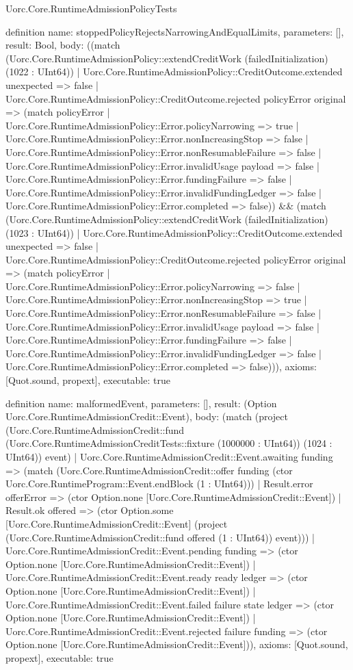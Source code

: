 \begin{lexlean}{Uorc.Core.RuntimeAdmissionPolicyTests}
\begin{semanticmodule}
definition{
  name: stoppedPolicyRejectsNarrowingAndEqualLimits,
  parameters: [],
  result: Bool,
  body: ((match (Uorc.Core.RuntimeAdmissionPolicy::extendCreditWork (failedInitialization) (1022 : UInt64))
    | Uorc.Core.RuntimeAdmissionPolicy::CreditOutcome.extended unexpected => false
    | Uorc.Core.RuntimeAdmissionPolicy::CreditOutcome.rejected policyError original => (match policyError
      | Uorc.Core.RuntimeAdmissionPolicy::Error.policyNarrowing => true
      | Uorc.Core.RuntimeAdmissionPolicy::Error.nonIncreasingStop => false
      | Uorc.Core.RuntimeAdmissionPolicy::Error.nonResumableFailure => false
      | Uorc.Core.RuntimeAdmissionPolicy::Error.invalidUsage payload => false
      | Uorc.Core.RuntimeAdmissionPolicy::Error.fundingFailure => false
      | Uorc.Core.RuntimeAdmissionPolicy::Error.invalidFundingLedger => false
      | Uorc.Core.RuntimeAdmissionPolicy::Error.completed => false)) && (match (Uorc.Core.RuntimeAdmissionPolicy::extendCreditWork (failedInitialization) (1023 : UInt64))
    | Uorc.Core.RuntimeAdmissionPolicy::CreditOutcome.extended unexpected => false
    | Uorc.Core.RuntimeAdmissionPolicy::CreditOutcome.rejected policyError original => (match policyError
      | Uorc.Core.RuntimeAdmissionPolicy::Error.policyNarrowing => false
      | Uorc.Core.RuntimeAdmissionPolicy::Error.nonIncreasingStop => true
      | Uorc.Core.RuntimeAdmissionPolicy::Error.nonResumableFailure => false
      | Uorc.Core.RuntimeAdmissionPolicy::Error.invalidUsage payload => false
      | Uorc.Core.RuntimeAdmissionPolicy::Error.fundingFailure => false
      | Uorc.Core.RuntimeAdmissionPolicy::Error.invalidFundingLedger => false
      | Uorc.Core.RuntimeAdmissionPolicy::Error.completed => false))),
  axioms: [Quot.sound, propext],
  executable: true
}

definition{
  name: malformedEvent,
  parameters: [],
  result: (Option Uorc.Core.RuntimeAdmissionCredit::Event),
  body: (match (project (Uorc.Core.RuntimeAdmissionCredit::fund (Uorc.Core.RuntimeAdmissionCreditTests::fixture (1000000 : UInt64)) (1024 : UInt64)) event)
    | Uorc.Core.RuntimeAdmissionCredit::Event.awaiting funding => (match (Uorc.Core.RuntimeAdmissionCredit::offer funding (ctor Uorc.Core.RuntimeProgram::Event.endBlock (1 : UInt64)))
      | Result.error offerError => (ctor Option.none [Uorc.Core.RuntimeAdmissionCredit::Event])
      | Result.ok offered => (ctor Option.some [Uorc.Core.RuntimeAdmissionCredit::Event] (project (Uorc.Core.RuntimeAdmissionCredit::fund offered (1 : UInt64)) event)))
    | Uorc.Core.RuntimeAdmissionCredit::Event.pending funding => (ctor Option.none [Uorc.Core.RuntimeAdmissionCredit::Event])
    | Uorc.Core.RuntimeAdmissionCredit::Event.ready ready ledger => (ctor Option.none [Uorc.Core.RuntimeAdmissionCredit::Event])
    | Uorc.Core.RuntimeAdmissionCredit::Event.failed failure state ledger => (ctor Option.none [Uorc.Core.RuntimeAdmissionCredit::Event])
    | Uorc.Core.RuntimeAdmissionCredit::Event.rejected failure funding => (ctor Option.none [Uorc.Core.RuntimeAdmissionCredit::Event])),
  axioms: [Quot.sound, propext],
  executable: true
}


\end{semanticmodule}
\end{lexlean}
